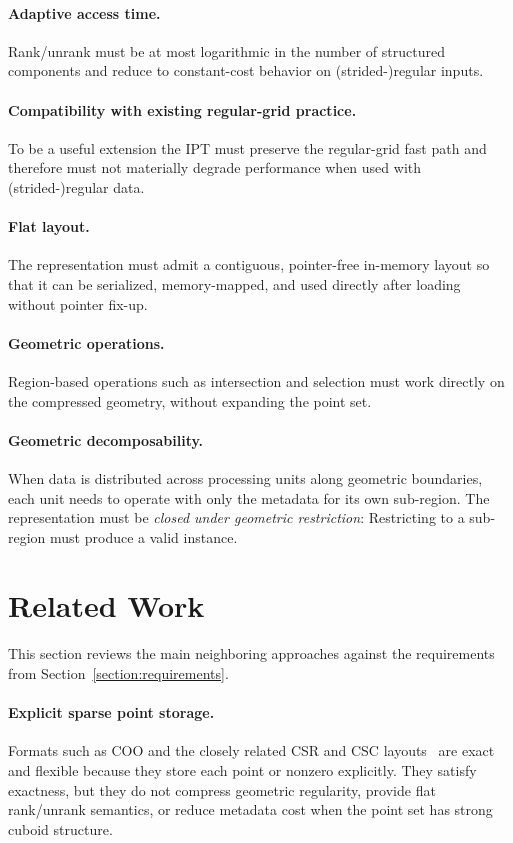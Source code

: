 \documentclass[manuscript,screen,review]{acmart}
\theoremstyle{definition}
\theoremstyle{plain}
\begin{document}
\paragraph{Adaptive access time.}
Rank/unrank must be at most logarithmic in the number of structured components and reduce to constant-cost behavior on (strided-)regular inputs.

\paragraph{Compatibility with existing regular-grid practice.}
To be a useful extension the IPT must preserve the regular-grid fast
path and therefore must not materially degrade performance when used
with (strided-)regular data.

\paragraph{Flat layout.}
The representation must admit a contiguous, pointer-free in-memory layout so that it can be serialized, memory-mapped, and used directly after loading without pointer fix-up.

\paragraph{Geometric operations.}
Region-based operations such as intersection and selection must work directly on the compressed geometry, without expanding the point set.

\paragraph{Geometric decomposability.}
When data is distributed across processing units along geometric
boundaries, each unit needs to operate with only the metadata for its own sub-region.
The representation must be \emph{closed under geometric restriction}: Restricting to a sub-region must produce a valid instance.

\section{Related Work}
\label{section:existing}

This section reviews the main neighboring approaches against the
requirements from Section~\ref{section:requirements}.

\paragraph{Explicit sparse point storage.}
Formats such as COO and the closely related CSR and CSC
layouts~\cite{Saad2003,Barrett1994} are exact and flexible because
they store each point or nonzero explicitly. They satisfy exactness,
but they do not compress geometric regularity, provide flat
rank/unrank semantics, or reduce metadata cost when the point set has
strong cuboid structure.
\end{document}
